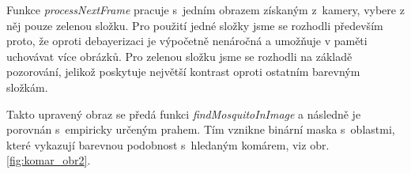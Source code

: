 \documentclass[a4paper,10pt]{article}
\begin{document}
		Funkce \textit{processNextFrame} pracuje s~jedním obrazem získaným z~kamery, vybere z něj pouze zelenou složku.
		Pro použití jedné složky jsme se rozhodli především proto, že oproti debayerizaci je výpočetně nenáročná a 
		umožňuje v paměti uchovávat více obrázků. Pro zelenou složku jsme se rozhodli na základě pozorování, 
		jelikož poskytuje největší kontrast oproti ostatním barevným složkám.

		Takto upravený obraz se předá funkci \textit{findMosquitoInImage} a 
		následně je porovnán s~empiricky určeným prahem.
		Tím vznikne binární maska s~oblastmi, které vykazují barevnou podobnost s~hle\-da\-ným komárem, viz obr. \ref{fig:komar_obr2}.

		\begin{figure}[!htb]
		  \hfill

		  \vfill
		

\end{figure}
\end{document}
